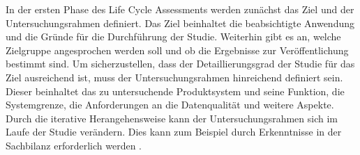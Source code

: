 In der ersten Phase des Life Cycle Assessments werden zunächst das Ziel und der Untersuchungsrahmen definiert. Das Ziel beinhaltet die beabsichtigte Anwendung und die Gründe für die Durchführung der Studie. Weiterhin gibt es an, welche Zielgruppe angesprochen werden soll und ob die Ergebnisse zur Veröffentlichung bestimmt sind. Um sicherzustellen, dass der Detaillierungsgrad der Studie für das Ziel ausreichend ist, muss der Untersuchungsrahmen hinreichend definiert sein. Dieser beinhaltet das zu untersuchende Produktsystem und seine Funktion, die Systemgrenze, die Anforderungen an die Datenqualität und weitere Aspekte. Durch die iterative Herangehensweise kann der Untersuchungsrahmen sich im Laufe der Studie verändern. Dies kann zum Beispiel durch Erkenntnisse in der Sachbilanz erforderlich werden .
